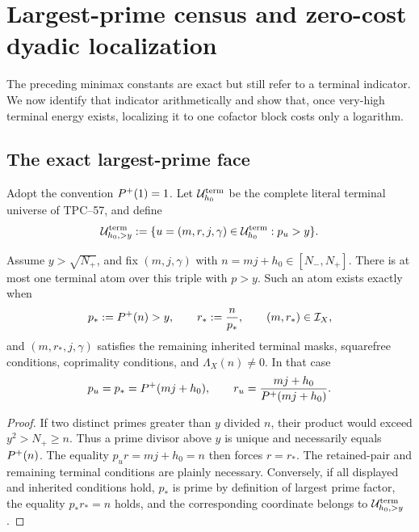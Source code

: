 \section{Largest-prime census and zero-cost dyadic localization}
\label{sec:tpc59-terminal}

The preceding minimax constants are exact but still refer to a terminal
indicator.  We now identify that indicator arithmetically and show that,
once very-high terminal energy exists, localizing it to one cofactor block
costs only a logarithm.

\subsection{The exact largest-prime face}

Adopt the convention \(P^{+}(1)=1\).  Let
\(\mathcal U_{h_0}^{\rm term}\) be the complete literal terminal universe of
TPC--57, and define
\begin{equation}
 \mathcal U_{h_0,>y}^{\rm term}
 :=\{u=(m,r,j,\gamma)\in\mathcal U_{h_0}^{\rm term}:p_u>y\}.
 \label{eq:tpc59-very-high-terminal-universe}
\end{equation}

\begin{theorem}
\label{thm:tpc59-largest-prime-census}
Assume \(y>\sqrt{N_+}\), and fix \((m,j,\gamma)\) with
\(n=mj+h_0\in[N_-,N_+]\).  There is at most one terminal atom over this
triple with \(p>y\).  Such an atom exists exactly when
\begin{equation}
 p_*:=P^{+}(n)>y,
 \qquad
 r_*:=\frac n{p_*},
 \qquad
 (m,r_*)\in\mathcal I_X,
 \label{eq:tpc59-largest-prime-retained-test}
\end{equation}
and \((m,r_*,j,\gamma)\) satisfies the remaining inherited terminal masks,
squarefree conditions, coprimality conditions, and
\(\Lambda_X(n)\ne0\).  In that case
\begin{equation}
 p_u=p_* = P^{+}(mj+h_0),
 \qquad
 r_u=\frac{mj+h_0}{P^{+}(mj+h_0)}.
 \label{eq:tpc59-largest-prime-formula}
\end{equation}
\end{theorem}

\begin{proof}
If two distinct primes greater than \(y\) divided \(n\), their product
would exceed \(y^2>N_+\ge n\).  Thus a prime divisor above \(y\) is unique
and necessarily equals \(P^{+}(n)\).  The equality
\(p_ur=mj+h_0=n\) then forces \(r=r_*\).  The retained-pair and remaining
terminal conditions are plainly necessary.  Conversely, if all displayed
and inherited conditions hold, \(p_*\) is prime by definition of largest
prime factor, the equality \(p_*r_*=n\) holds, and the corresponding
coordinate belongs to \(\mathcal U_{h_0,>y}^{\rm term}\).
\end{proof}

